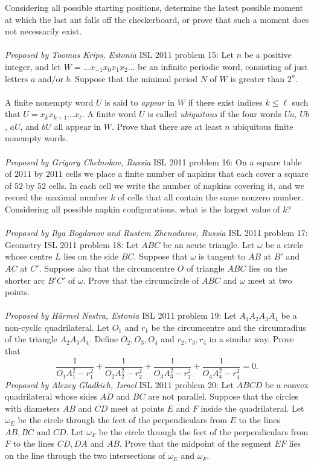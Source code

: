 Considering all possible starting positions, determine the latest possible moment at which the last ant falls off the checkerboard, or prove that such a moment does not necessarily exist. \\\\
\textit{Proposed by Toomas Krips, Estonia} 
ISL 2011 problem 15:  Let $n$ be a positive integer, and let $W = \ldots x_{-1}x_0x_1x_2 \ldots$ be an infinite periodic word, consisting of just letters $a$ and/or $b$. Suppose that the minimal period $N$ of $W$ is greater than $2^n$. \\\\
A finite nonempty word $U$ is said to \textit{appear} in $W$ if there exist indices $k \leq \ell$ such that $U=x_k x_{k+1} \ldots x_{\ell}$. A finite word $U$ is called \textit{ubiquitous} if the four words $Ua$, $Ub$, $aU$, and $bU$ all appear in $W$. Prove that there are at least $n$ ubiquitous finite nonempty words. \\\\
\textit{Proposed by Grigory Chelnokov, Russia} 
ISL 2011 problem 16:  On a square table of $2011$ by $2011$ cells we place a finite number of napkins that each cover a square of $52$ by $52$ cells. In each cell we write the number of napkins covering it, and we record the maximal number $k$ of cells that all contain the same nonzero number. Considering all possible napkin configurations, what is the largest value of $k$? \\\\
\textit{Proposed by Ilya Bogdanov and Rustem Zhenodarov, Russia} 
ISL 2011 problem 17:  Geometry 
ISL 2011 problem 18:  Let $ABC$ be an acute triangle. Let $\omega$ be a circle whose centre $L$ lies on the side $BC$. Suppose that $\omega$ is tangent to $AB$ at $B'$ and $AC$ at $C'$. Suppose also that the circumcentre $O$ of triangle $ABC$ lies on the shorter arc $B'C'$ of $\omega$. Prove that the circumcircle of $ABC$ and $\omega$ meet at two points. \\\\
\textit{Proposed by Härmel Nestra, Estonia} 
ISL 2011 problem 19:  Let $A_1A_2A_3A_4$ be a non-cyclic quadrilateral. Let $O_1$ and $r_1$ be the circumcentre and the circumradius of the triangle $A_2A_3A_4$. Define $O_2,O_3,O_4$ and $r_2,r_3,r_4$ in a similar way. Prove that
\[
\frac{1}{O_1A_1^2-r_1^2}+\frac{1}{O_2A_2^2-r_2^2}+\frac{1}{O_3A_3^2-r_3^2}+\frac{1}{O_4A_4^2-r_4^2}=0.
\]
\textit{Proposed by Alexey Gladkich, Israel} 
ISL 2011 problem 20:  Let $ABCD$ be a convex quadrilateral whose sides $AD$ and $BC$ are not parallel. Suppose that the circles with diameters $AB$ and $CD$ meet at points $E$ and $F$ inside the quadrilateral. Let $\omega_E$ be the circle through the feet of the perpendiculars from $E$ to the lines $AB,BC$ and $CD$. Let $\omega_F$ be the circle through  the feet of the perpendiculars from $F$ to the lines $CD,DA$ and $AB$. Prove that the midpoint of the segment $EF$ lies on the line through the two intersections of $\omega_E$ and $\omega_F$. \\\\
